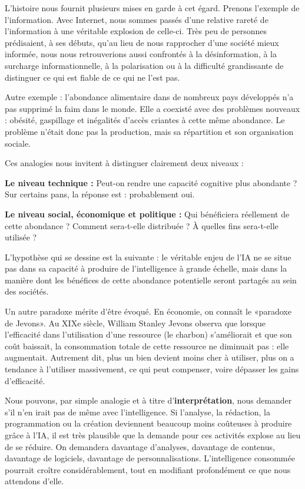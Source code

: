 L'histoire nous fournit plusieurs mises en garde à cet égard. Prenons l'exemple de l'information. Avec Internet, nous sommes passés d'une relative rareté de l'information à une véritable explosion de celle-ci. Très peu de personnes prédisaient, à ses débuts, qu'au lieu de nous rapprocher d'une société mieux informée, nous nous retrouverions aussi confrontés à la désinformation, à la surcharge informationnelle, à la polarisation ou à la difficulté grandissante de distinguer ce qui est fiable de ce qui ne l'est pas.

Autre exemple : l'abondance alimentaire dans de nombreux pays développés n'a pas supprimé la faim dans le monde. Elle a coexisté avec des problèmes nouveaux : obésité, gaspillage et inégalités d'accès criantes à cette même abondance. Le problème n'était donc pas la production, mais sa répartition et son organisation sociale.

Ces analogies nous invitent à distinguer clairement deux niveaux :

\begin{eplist}
\item \textbf{Le niveau technique :} Peut-on rendre une capacité cognitive plus abondante ? Sur certains pans, la réponse est : probablement oui.
\item \textbf{Le niveau social, économique et politique :} Qui bénéficiera réellement de cette abondance ? Comment sera-t-elle distribuée ? À quelles fins sera-t-elle utilisée ?
\end{eplist}
L'hypothèse qui se dessine est la suivante : le véritable enjeu de l'IA ne se situe pas dans sa capacité à produire de l'intelligence à grande échelle, mais dans la manière dont les bénéfices de cette abondance potentielle seront partagés au sein des sociétés.

Un autre paradoxe mérite d'être évoqué. En économie, on connaît le «paradoxe de Jevons». Au XIXe siècle, William Stanley Jevons observa que lorsque l'efficacité dans l'utilisation d'une ressource (le charbon) s'améliorait et que son coût baissait, la consommation totale de cette ressource ne diminuait pas : elle augmentait. Autrement dit, plus un bien devient moins cher à utiliser, plus on a tendance à l'utiliser massivement, ce qui peut compenser, voire dépasser les gains d'efficacité.

Nous pouvons, par simple analogie et à titre d'\textbf{interprétation}, nous demander s'il n'en irait pas de même avec l'intelligence. Si l'analyse, la rédaction, la programmation ou la création deviennent beaucoup moins coûteuses à produire grâce à l'IA, il est très plausible que la demande pour ces activités explose au lieu de se réduire. On demandera davantage d'analyses, davantage de contenus, davantage de logiciels, davantage de personnalisations. L'intelligence consommée pourrait croître considérablement, tout en modifiant profondément ce que nous attendons d'elle.

